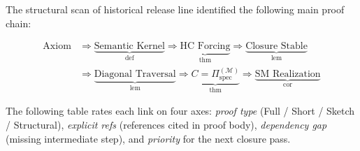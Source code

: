 \documentclass[12pt,a4paper]{article}
\DeclareRobustCommand{\QSCver}[1]{archival stage}
\renewcommand{\QSCver}[1]{historical release line}
\begin{document}
The structural scan of \QSCver{v2.27.4} identified the following main proof chain:

{\small
\[
\begin{aligned}
\text{Axiom}
&\Rightarrow \underbrace{\text{Semantic Kernel}}_{\text{def}}
\Rightarrow \underbrace{\text{HC Forcing}}_{\text{thm}}
\Rightarrow \underbrace{\text{Closure Stable}}_{\text{lem}}\\[2pt]
&\Rightarrow \underbrace{\text{Diagonal Traversal}}_{\text{lem}}
\Rightarrow \underbrace{C = \Pi^{(\mathcal{M})}_{\mathrm{spec}}}_{\text{thm}}
\Rightarrow \underbrace{\text{SM Realization}}_{\text{cor}}
\end{aligned}
\]
}

The following table rates each link on four axes:
\emph{proof type} (Full / Short / Sketch / Structural),
\emph{explicit refs} (references cited in proof body),
\emph{dependency gap} (missing intermediate step),
and \emph{priority} for the next closure pass.
\end{document}
